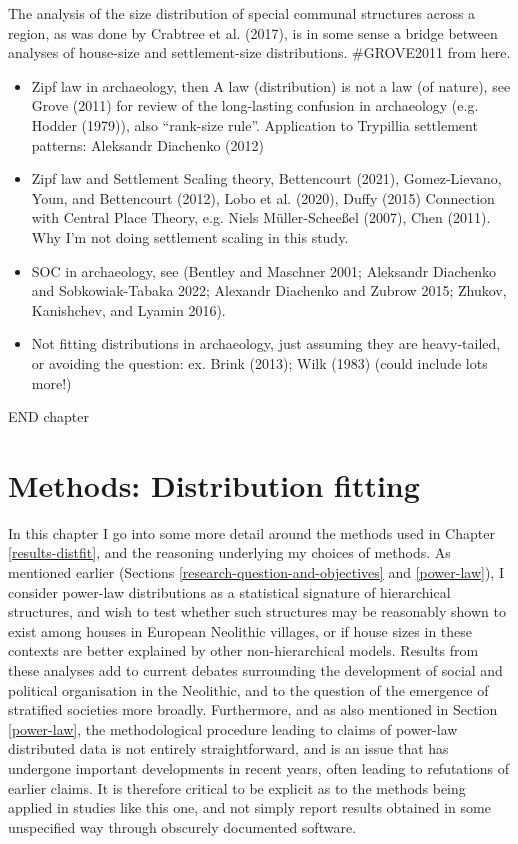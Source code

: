 \documentclass[
  12pt,
  a4paper, twoside]{book}
\begin{document}
The analysis of the size distribution of special communal structures across a region, as was done by Crabtree et al. (2017), is in some sense a bridge between analyses of house-size and settlement-size distributions. \#GROVE2011 from here.

\begin{itemize}
\item
  Zipf law in archaeology, then A law (distribution) is not a law (of nature), see Grove (2011) for review of the long-lasting confusion in archaeology (e.g. Hodder (1979)), also ``rank-size rule''. Application to Trypillia settlement patterns: Aleksandr Diachenko (2012)
\item
  Zipf law and Settlement Scaling theory, Bettencourt (2021), Gomez-Lievano, Youn, and Bettencourt (2012), Lobo et al. (2020), Duffy (2015) Connection with Central Place Theory, e.g. Niels Müller-Scheeßel (2007), Chen (2011). Why I'm not doing settlement scaling in this study.
\end{itemize}

\begin{itemize}
\item
  SOC in archaeology, see (Bentley and Maschner 2001; Aleksandr Diachenko and Sobkowiak-Tabaka 2022; Alexandr Diachenko and Zubrow 2015; Zhukov, Kanishchev, and Lyamin 2016).
\item
  Not fitting distributions in archaeology, just assuming they are heavy-tailed, or avoiding the question: ex. Brink (2013); Wilk (1983) (could include lots more!)
\end{itemize}

END chapter

\hypertarget{methods-distfit}{%
\chapter{Methods: Distribution fitting}\label{methods-distfit}}

In this chapter I go into some more detail around the methods used in Chapter \ref{results-distfit}, and the reasoning underlying my choices of methods. As mentioned earlier (Sections \ref{research-question-and-objectives} and \ref{power-law}), I consider power-law distributions as a statistical signature of hierarchical structures, and wish to test whether such structures may be reasonably shown to exist among houses in European Neolithic villages, or if house sizes in these contexts are better explained by other non-hierarchical models. Results from these analyses add to current debates surrounding the development of social and political organisation in the Neolithic, and to the question of the emergence of stratified societies more broadly. Furthermore, and as also mentioned in Section \ref{power-law}, the methodological procedure leading to claims of power-law distributed data is not entirely straightforward, and is an issue that has undergone important developments in recent years, often leading to refutations of earlier claims. It is therefore critical to be explicit as to the methods being applied in studies like this one, and not simply report results obtained in some unspecified way through obscurely documented software.
\end{document}
